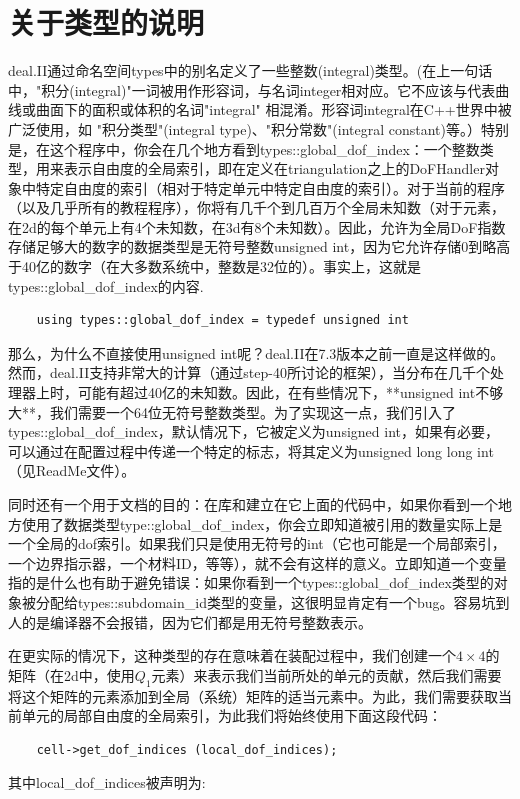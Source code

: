 \documentclass[nofonts]{ctexart} %
\begin{document}
\section{关于类型的说明}
deal.II通过命名空间types中的别名定义了一些整数(integral)类型。(在上一句话中，"积分(integral)"一词被用作形容词，与名词integer相对应。它不应该与代表曲线或曲面下的面积或体积的名词"integral" 相混淆。形容词integral在C++世界中被广泛使用，如 "积分类型"(integral type)、"积分常数"(integral constant)等。）特别是，在这个程序中，你会在几个地方看到types::global\_dof\_index：一个整数类型，用来表示自由度的全局索引，即在定义在triangulation之上的DoFHandler对象中特定自由度的索引（相对于特定单元中特定自由度的索引）。对于当前的程序（以及几乎所有的教程程序），你将有几千个到几百万个全局未知数（对于元素，在2d的每个单元上有4个未知数，在3d有8个未知数）。因此，允许为全局DoF指数存储足够大的数字的数据类型是无符号整数unsigned int，因为它允许存储0到略高于40亿的数字（在大多数系统中，整数是32位的）。事实上，这就是types::global\_dof\_index的内容.
\begin{lstlisting}
    using types::global_dof_index = typedef unsigned int
\end{lstlisting}
那么，为什么不直接使用unsigned int呢？deal.II在7.3版本之前一直是这样做的。然而，deal.II支持非常大的计算（通过step-40所讨论的框架），当分布在几千个处理器上时，可能有超过40亿的未知数。因此，在有些情况下，**unsigned int不够大**，我们需要一个64位无符号整数类型。为了实现这一点，我们引入了types::global\_dof\_index，默认情况下，它被定义为unsigned int，如果有必要，可以通过在配置过程中传递一个特定的标志，将其定义为unsigned long long int（见ReadMe文件）。

同时还有一个用于文档的目的：在库和建立在它上面的代码中，如果你看到一个地方使用了数据类型type::global\_dof\_index，你会立即知道被引用的数量实际上是一个全局的dof索引。如果我们只是使用无符号的int（它也可能是一个局部索引，一个边界指示器，一个材料ID，等等），就不会有这样的意义。立即知道一个变量指的是什么也有助于避免错误：如果你看到一个types::global\_dof\_index类型的对象被分配给types::subdomain\_id类型的变量，这很明显肯定有一个bug。容易坑到人的是编译器不会报错，因为它们都是用无符号整数表示。

在更实际的情况下，这种类型的存在意味着在装配过程中，我们创建一个$4\times4$的矩阵（在2d中，使用$Q_1$元素）来表示我们当前所处的单元的贡献，然后我们需要将这个矩阵的元素添加到全局（系统）矩阵的适当元素中。为此，我们需要获取当前单元的局部自由度的全局索引，为此我们将始终使用下面这段代码：
\begin{lstlisting}
    cell->get_dof_indices (local_dof_indices);
\end{lstlisting}
其中local\_dof\_indices被声明为:
\end{document}
